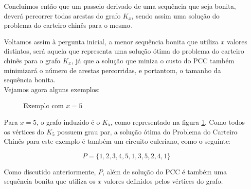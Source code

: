 \documentclass[12pt, a4paper]{article}
\begin{document}
        Concluimos então que um passeio derivado de uma sequência que seja bonita, deverá percorrer todas arestas do grafo $K_x$, sendo assim uma solução do problema do carteiro chinês para o mesmo.

        Voltamos assim à pergunta inicial, a menor sequência bonita que utiliza $x$ valores distintos, será aquela que representa uma solução ótima do problema do carteiro chinês para o grafo $K_x$, já que a solução que miniza o custo do PCC também minimizará o número de arestas percorridas, e portantom, o tamanho da sequência bonita. \\
 
        Vejamos agora alguns exemplos:

        \begin{figure}[h]
            \centering
            \caption{Exemplo com $x=5$}
            \label{k5}
        \end{figure}

        Para $x=5$, o grafo induzido é o $K_5$, como representado na figura \ref{k5}.
        Como todos os vértices do $K_5$ possuem grau par, a solução ótima do Problema do Carteiro Chinês para este exemplo é também um circuito euleriano, como o seguinte:


        \[ P = \{1, 2, 3, 4, 5, 1, 3, 5, 2, 4, 1\} \]

        Como discutido anteriormente, $P$, além de solução do PCC é também uma sequência bonita que utiliza os $x$ valores definidos pelos vértices do grafo.
        
\end{document}
